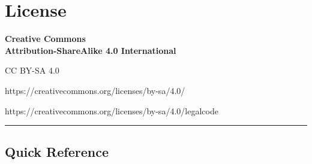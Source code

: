 
\newpage
\section*{License}

\begingroup
\centering
{\sffamily\Large\bfseries Creative Commons\\[0.2em]
	Attribution-ShareAlike 4.0 International}\par
\medskip
{\sffamily\large CC BY-SA 4.0}\par
\medskip
{\small\ttfamily https://creativecommons.org/licenses/by-sa/4.0/}\par
\medskip
{\small\ttfamily https://creativecommons.org/licenses/by-sa/4.0/legalcode}\par
\endgroup

\medskip
\noindent\rule{\textwidth}{0.6pt}
\smallskip

\subsection*{Quick Reference}


